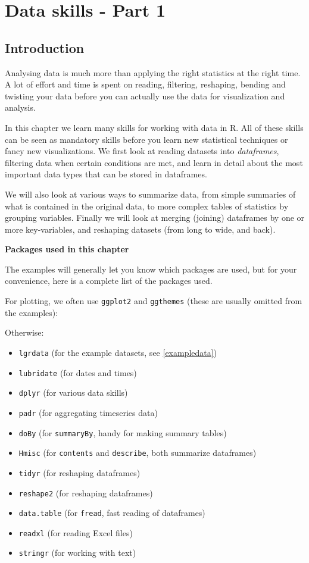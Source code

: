 \documentclass[]{book}
\providecommand{\tightlist}{%
  \setlength{\itemsep}{0pt}\setlength{\parskip}{0pt}}
\begin{document}
\hypertarget{dataskills1}{%
\chapter{Data skills - Part 1}\label{dataskills1}}

\hypertarget{introduction}{%
\section{Introduction}\label{introduction}}

Analysing data is much more than applying the right statistics at the right time. A lot of effort and time is spent on reading, filtering, reshaping, bending and twisting your data before you can actually use the data for visualization and analysis.

In this chapter we learn many skills for working with data in R. All of these skills can be seen as mandatory skills before you learn new statistical techniques or fancy new visualizations. We first look at reading datasets into \emph{dataframes}, filtering data when certain conditions are met, and learn in detail about the most important data types that can be stored in dataframes.

We will also look at various ways to summarize data, from simple summaries of what is contained in the original data, to more complex tables of statistics by grouping variables. Finally we will look at merging (joining) dataframes by one or more key-variables, and reshaping datasets (from long to wide, and back).

\textbf{Packages used in this chapter}

The examples will generally let you know which packages are used, but for your convenience, here is a complete list of the packages used.

For plotting, we often use \texttt{ggplot2} and \texttt{ggthemes} (these are usually omitted from the examples):

Otherwise:

\begin{itemize}
\tightlist
\item
  \texttt{lgrdata} (for the example datasets, see \ref{exampledata})
\item
  \texttt{lubridate} (for dates and times)
\item
  \texttt{dplyr} (for various data skills)
\item
  \texttt{padr} (for aggregating timeseries data)
\item
  \texttt{doBy} (for \texttt{summaryBy}, handy for making summary tables)
\item
  \texttt{Hmisc} (for \texttt{contents} and \texttt{describe}, both summarize dataframes)
\item
  \texttt{tidyr} (for reshaping dataframes)
\item
  \texttt{reshape2} (for reshaping dataframes)
\item
  \texttt{data.table} (for \texttt{fread}, fast reading of dataframes)
\item
  \texttt{readxl} (for reading Excel files)
\item
  \texttt{stringr} (for working with text)
\end{itemize}
\end{document}
